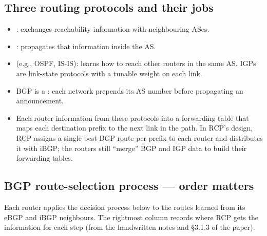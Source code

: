 \subsection{Three routing protocols and their jobs}
\begin{itemize}
\item {}: exchanges reachability information with neighbouring ASes.
\item {}: propagates that information inside the AS.
\item {} (e.g., OSPF, IS-IS): learns how to reach other routers in the same AS. IGPs are link-state protocols with a tunable weight on each link.
\item BGP is a : each network prepends its AS number before propagating an announcement.
\item Each router  information from these protocols into a forwarding table that maps each destination prefix to the next link in the path. In RCP's design, RCP assigns a single best BGP route per prefix to each router and distributes it with iBGP; the routers still ``merge'' BGP and IGP data to build their forwarding tables.
\end{itemize}

\subsection{BGP route-selection process --- order matters}

Each router applies the decision process below to the routes learned from its eBGP and iBGP neighbours. The rightmost column records where RCP gets the information for each step (from the handwritten notes and \S3.1.3 of the paper).

